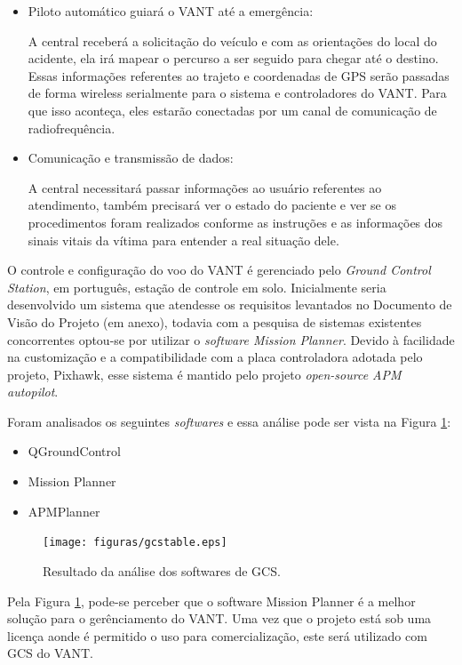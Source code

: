 \begin{itemize}
 \item Piloto automático guiará o VANT até a emergência: 

  A central receberá a solicitação do veículo e com as orientações do local do acidente, ela irá mapear o percurso a ser seguido para chegar até o destino.  Essas informações referentes ao trajeto e coordenadas de GPS serão passadas de forma wireless serialmente para o sistema e controladores do VANT. Para que isso aconteça, eles estarão conectadas por um canal de comunicação de radiofrequência. 

  \item Comunicação e transmissão de dados:

   A central necessitará passar informações ao usuário referentes ao atendimento, também precisará ver o estado do paciente e ver se os procedimentos foram realizados conforme as instruções e as informações dos sinais vitais da vítima para entender a real situação dele. 
\end{itemize}
O controle e configura\c{c}\~ao do voo do VANT \'e gerenciado pelo \textit{Ground Control Station}, em português, 
esta\c{c}\~ao de controle em solo. Inicialmente seria desenvolvido um sistema que atendesse os requisitos levantados no Documento
de Visão do Projeto (em anexo), todavia com a pesquisa de sistemas existentes concorrentes optou-se por utilizar o \textit{software Mission Planner}. 
Devido à facilidade na customização e a compatibilidade com a placa controladora adotada 
pelo projeto, Pixhawk, esse sistema é mantido pelo projeto \textit{open-source  APM autopilot}.\cite{gcs}

Foram analisados os seguintes \textit{softwares} e essa análise pode ser vista na Figura \ref{fig:gcstable}: 

\begin{itemize}
  \item QGroundControl
  \item Mission Planner
  \item APMPlanner
\end{itemize}
\pagebreak
\begin{figure}[H]
    \centering
      \texttt{[image: figuras/gcstable.eps]}
    \caption{Resultado da análise dos softwares de GCS.}
    \label{fig:gcstable}
\end{figure}

\pagebreak
Pela Figura \ref{fig:gcstable}, pode-se perceber que o software Mission Planner é a melhor solução para o gerênciamento do VANT. Uma vez que o projeto está sob uma licença aonde é permitido o uso para comercialização, este será utilizado com GCS do VANT.

